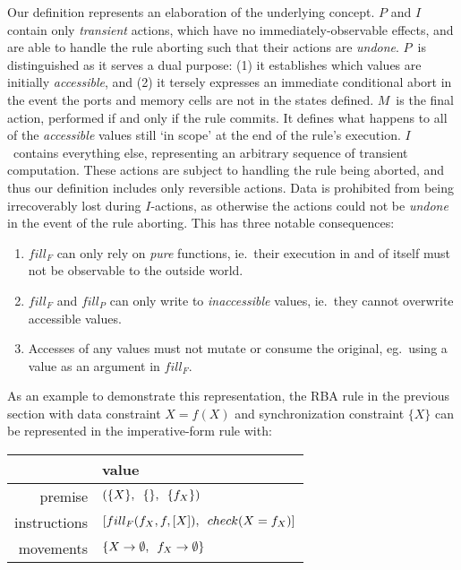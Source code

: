 Our definition represents an elaboration of the underlying concept. $P$ and $I$ contain only \textit{transient} actions, which have no immediately-observable effects, and are able to handle the rule aborting such that their actions are \textit{undone}. $P$~is distinguished as it serves a dual purpose: (1) it establishes which values are initially \textit{accessible}, and (2) it tersely expresses an immediate conditional abort in the event the ports and memory cells are not in the states defined. $M$~is the final action, performed if and only if the rule commits. It defines what happens to all of the \textit{accessible} values still `in scope' at the end of the rule's execution. $I$~contains everything else, representing an arbitrary sequence of transient computation. These actions are subject to handling the rule being aborted, and thus our definition includes only reversible actions. Data is prohibited from being irrecoverably lost during $I$-actions, as otherwise the actions could not be \textit{undone} in the event of the rule aborting. This has three notable consequences:
\begin{enumerate}
	\item $fill_F$ can only rely on \textit{pure} functions, ie.\ their execution in and of itself must not be observable to the outside world.
	\item $fill_F$ and $fill_P$ can only write to \textit{inaccessible} values, ie.\ they cannot overwrite accessible values.
	\item Accesses of any values must not mutate or consume the original, eg.\ using a value as an argument in $fill_F$.
\end{enumerate}

As an example to demonstrate this representation, the RBA rule in the previous section with data constraint $X=f(X)$
and synchronization constraint $\{X\}$ can be represented in the imperative-form rule with:

\vspace{1em}
\noindent{}
\begin{tabular}{r|l}
	\centering
		&  value \\ \hline
	premise	&  $(\{X\}, \enskip\{\}, \enskip\{f_X\})$ \\
	instructions	& $[fill_F(f_X, f, [X]), \enskip{} check(X = f_X)]$ \\
	movements	& $\{X \rightarrow{}\emptyset{}, \enskip f_X \rightarrow{}\emptyset{}\}$ 
\end{tabular}
\vspace{1em}

